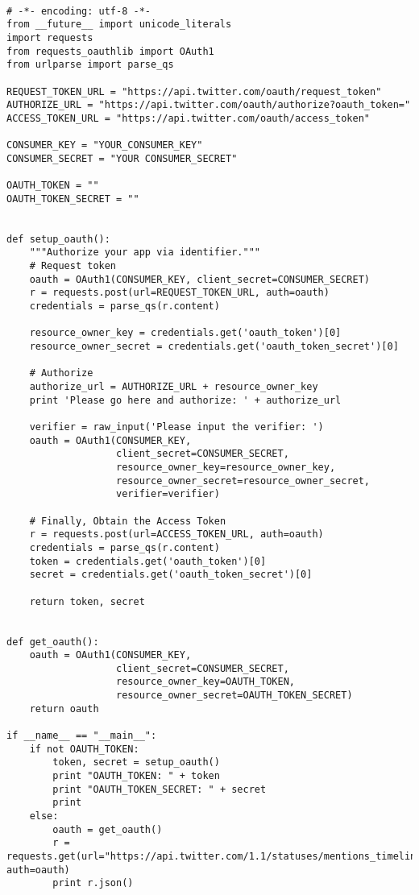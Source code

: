 \documentclass{article}
\begin{document}
\begin{lstlisting}

# -*- encoding: utf-8 -*-
from __future__ import unicode_literals
import requests
from requests_oauthlib import OAuth1
from urlparse import parse_qs

REQUEST_TOKEN_URL = "https://api.twitter.com/oauth/request_token"
AUTHORIZE_URL = "https://api.twitter.com/oauth/authorize?oauth_token="
ACCESS_TOKEN_URL = "https://api.twitter.com/oauth/access_token"

CONSUMER_KEY = "YOUR_CONSUMER_KEY"
CONSUMER_SECRET = "YOUR CONSUMER_SECRET"

OAUTH_TOKEN = ""
OAUTH_TOKEN_SECRET = ""


def setup_oauth():
    """Authorize your app via identifier."""
    # Request token
    oauth = OAuth1(CONSUMER_KEY, client_secret=CONSUMER_SECRET)
    r = requests.post(url=REQUEST_TOKEN_URL, auth=oauth)
    credentials = parse_qs(r.content)
    
    resource_owner_key = credentials.get('oauth_token')[0]
    resource_owner_secret = credentials.get('oauth_token_secret')[0]
    
    # Authorize
    authorize_url = AUTHORIZE_URL + resource_owner_key
    print 'Please go here and authorize: ' + authorize_url
    
    verifier = raw_input('Please input the verifier: ')
    oauth = OAuth1(CONSUMER_KEY,
                   client_secret=CONSUMER_SECRET,
                   resource_owner_key=resource_owner_key,
                   resource_owner_secret=resource_owner_secret,
                   verifier=verifier)
    
    # Finally, Obtain the Access Token
    r = requests.post(url=ACCESS_TOKEN_URL, auth=oauth)
    credentials = parse_qs(r.content)
    token = credentials.get('oauth_token')[0]
    secret = credentials.get('oauth_token_secret')[0]
    
    return token, secret


def get_oauth():
    oauth = OAuth1(CONSUMER_KEY,
                   client_secret=CONSUMER_SECRET,
                   resource_owner_key=OAUTH_TOKEN,
                   resource_owner_secret=OAUTH_TOKEN_SECRET)
    return oauth

if __name__ == "__main__":
    if not OAUTH_TOKEN:
        token, secret = setup_oauth()
        print "OAUTH_TOKEN: " + token
        print "OAUTH_TOKEN_SECRET: " + secret
        print
    else:
        oauth = get_oauth()
        r = requests.get(url="https://api.twitter.com/1.1/statuses/mentions_timeline.json", auth=oauth)
        print r.json()

\end{lstlisting}
\end{document}
